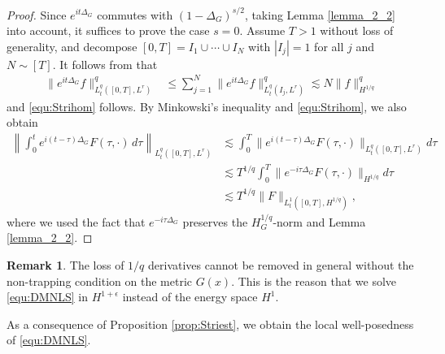 \documentclass[10pt%
]{amsart}
\numberwithin{equation}{section}
\theoremstyle{definition}
\newtheorem{remark}[theorem]{Remark}
\begin{document}
\begin{proof}
	Since $e^{it\Delta_G}$ commutes with $(1-\Delta_G)^{s/2}$, taking Lemma \ref{lemma_2_2} into account, it  suffices to prove the case $s=0$. Assume $T>1$ without loss of generality, and  decompose $[0,T]=I_1\cup\cdots\cup I_N$ with $|I_j|=1$ for all $j$ and $N\sim [T]$. It follows from \cite[Theorems 1.2 and 1.5]{Miz13} that
	\begin{align*}
		\|e^{it\Delta_G}f\|_{L_t^q([0,T], L^r)}^q
		&\le \sum_{j=1}^N \|e^{it\Delta_G}f\|_{L_t^q(I_j, L^r)}^q
		\lesssim N	\|f\|_{H^{1/q}}^q
	\end{align*}
	and \eqref{equ:Strihom} follows. By Minkowski's inequality and \eqref{equ:Strihom}, we also obtain
	\begin{align*}
		\left\| \int_0^t e^{i(t-\tau)\Delta_G}F(\tau,\cdot)\,d\tau\right\|_{L_t^q([0,T], L^r)}
		&\lesssim \int_0^T\|e^{i(t-\tau)\Delta_G}F(\tau,\cdot)\|_{L_t^q([0,T], L^r)}d\tau\\
		&\lesssim T^{1/q}\int_0^T\|e^{-i\tau\Delta_G}F(\tau,\cdot)\|_{H^{1/q}}d\tau\\
		&\lesssim T^{1/q}\|F\|_{L_t^1([0,T], H^{1/q})},
	\end{align*}
	where we used the fact that $e^{-i\tau\Delta_G}$ preserves the $H_G^{1/q}$-norm and Lemma \ref{lemma_2_2}. 
\end{proof}

\begin{remark}
	The loss of $1/q$ derivatives cannot be removed in general without the non-trapping condition on the metric $G(x)$. This is the reason that we solve \eqref{equ:DMNLS} in $H^{1+\epsilon}$ instead of the energy space $H^1$. 
\end{remark}


As a consequence of Proposition \ref{prop:Striest}, we obtain the local well-posedness of \eqref{equ:DMNLS}.
\end{document}
